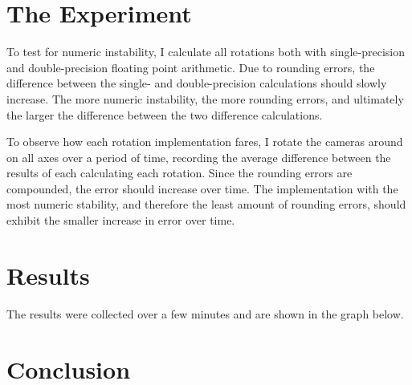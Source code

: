 \documentclass[a4paper]{article}
\begin{document}
\section{The Experiment}

To test for numeric instability, I calculate all rotations both with single-precision and double-precision floating point arithmetic. Due to rounding errors, the difference between the single- and double-precision calculations should slowly increase. The more numeric instability, the more rounding errors, and ultimately the larger the difference between the two difference calculations.

To observe how each rotation implementation fares, I rotate the cameras around on all axes over a period of time, recording the average difference between the results of each calculating each rotation. Since the rounding errors are compounded, the error should increase over time. The implementation with the most numeric stability, and therefore the least amount of rounding errors, should exhibit the smaller increase in error over time.

\section{Results}

The results were collected over a few minutes and are shown in the graph below.

\vspace{5 mm}

\begin{center}
\end{center}

\section{Conclusion}
\end{document}
